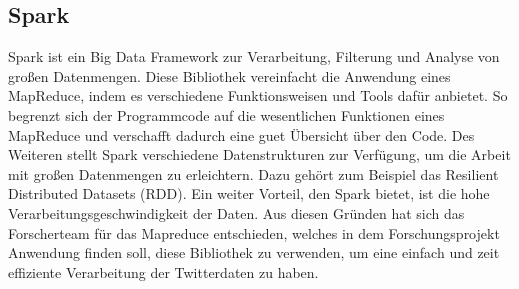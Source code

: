 	\subsection{Spark}
	
Spark ist ein Big Data Framework zur Verarbeitung, Filterung und Analyse von großen Datenmengen. Diese Bibliothek vereinfacht die Anwendung eines MapReduce, indem es verschiedene Funktionsweisen und Tools dafür anbietet. So begrenzt sich der Programmcode auf die wesentlichen Funktionen eines MapReduce und verschafft dadurch eine guet Übersicht über den Code. Des Weiteren stellt Spark verschiedene Datenstrukturen zur Verfügung, um die Arbeit mit großen Datenmengen zu erleichtern. Dazu gehört zum Beispiel das Resilient Distributed Datasets (RDD). Ein weiter Vorteil, den Spark bietet, ist die hohe Verarbeitungsgeschwindigkeit der Daten. Aus diesen Gründen hat sich das Forscherteam für das Mapreduce entschieden, welches in dem Forschungsprojekt Anwendung finden soll, diese Bibliothek zu verwenden, um eine einfach und zeit effiziente Verarbeitung der Twitterdaten zu haben.
	    
	

	
